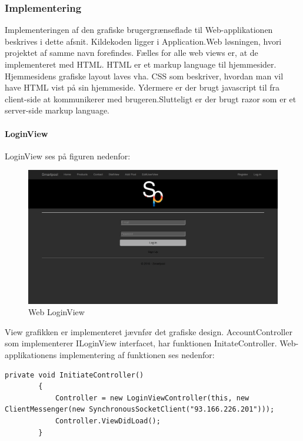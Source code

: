 \subsubsection{Implementering}
Implementeringen af den grafiske brugergrænseflade til Web-applikationen beskrives i dette afsnit. Kildekoden ligger i Application.Web løsningen, hvori projektet af samme navn forefindes. Fælles for alle web views er, at de implementeret med HTML. HTML er et markup language til hjemmesider. Hjemmesidens grafiske layout laves vha. CSS som beskriver, hvordan man vil have HTML vist på sin hjemmeside. Ydermere er der brugt javascript til fra client-side at kommunikerer med brugeren.Slutteligt er der brugt razor som er et server-side markup language. 

\paragraph{LoginView}
LoginView ses på figuren nedenfor:

\begin{figure}
	\centering
	\includegraphics[width=1.0\linewidth]{figs/implementering/web_login}
	\caption{Web LoginView}
	\label{fig:webloginview}
\end{figure}

View grafikken er implementeret jævnfør det grafiske design. AccountController som implementerer ILoginView interfacet, har funktionen InitateController. Web-applikationens implementering af funktionen ses nedenfor:

\begin{lstlisting}[caption=InitiateController, label=code:InitaiteController]
private void InitiateController()
        {
            Controller = new LoginViewController(this, new ClientMessenger(new SynchronousSocketClient("93.166.226.201")));
            Controller.ViewDidLoad();
        }
\end{lstlisting} 

